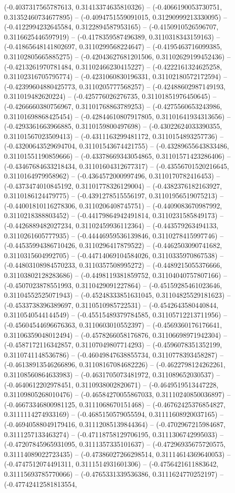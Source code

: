 (-0.4037317565787613, 0.31413374635810326) -- (-0.4066190053730751, 0.31352460734677895) -- (-0.4094751559091015, 0.31290999213330095) -- (-0.4122994232645584, 0.3122894587953165) -- (-0.4150910526596707, 0.3116625446597919) -- (-0.4178359587496389, 0.3110318343159163) -- (-0.41865648141802697, 0.3110299568224647) -- (-0.4195463716099385, 0.31102805665885275) -- (-0.42043627681201506, 0.31102629199452436) -- (-0.4213261970781484, 0.31102466230415227) -- (-0.4222161324625258, 0.31102316705795774) -- (-0.4231060830196331, 0.31102180572172594) -- (-0.42399604880425773, 0.3110205777568257) -- (-0.42488602987149193, 0.311019482620224) -- (-0.425776026276735, 0.31101851976450645) -- (-0.4266660380756967, 0.31101768863789253) -- (-0.4275560653243986, 0.31101698868425454) -- (-0.42844610807917805, 0.31101641934313656) -- (-0.4293361663966885, 0.3110159800497698) -- (-0.43022624033390355, 0.31101567023509413) -- (-0.4311163299481172, 0.3110154893257736) -- (-0.43200643529694704, 0.31101543674421755) -- (-0.43289655643833486, 0.31101551190859666) -- (-0.43378669343054865, 0.31101571423286406) -- (-0.43467684633218434, 0.31101604312677317) -- (-0.43556701520216645, 0.3110164979958962) -- (-0.4364572000997496, 0.3110170782416453) -- (-0.4373474010845192, 0.31101778326129004) -- (-0.4382376182163927, 0.3110186124479775) -- (-0.4391278515556197, 0.31101956519075213) -- (-0.44001810116278306, 0.3110206408745751) -- (-0.4409083670987992, 0.3110218388803452) -- (-0.44179864942491814, 0.3110231585849173) -- (-0.4426889482027234, 0.31102459936112364) -- (-0.443579263494133, 0.3110261605777935) -- (-0.44446959536139846, 0.3110278415997746) -- (-0.44535994386710426, 0.3110296417879522) -- (-0.4462503090741682, 0.3110315604992705) -- (-0.44714069104584026, 0.3110335970867538) -- (-0.44803108984570233, 0.3110357508995272) -- (-0.4489215055376666, 0.31103802128283686) -- (-0.4498119381859752, 0.31104040757807166) -- (-0.4507023878551993, 0.3110429091227864) -- (-0.45159285461023646, 0.31104552525071943) -- (-0.45248333851631045, 0.31104825529181623) -- (-0.4533738396389697, 0.3110510985722531) -- (-0.4542643580440844, 0.3110540544144549) -- (-0.45515489379784585, 0.31105712213711956) -- (-0.45604544696676363, 0.3110603010552397) -- (-0.4569360176176641, 0.31106359048012494) -- (-0.4578266058176876, 0.31106698971942304) -- (-0.4587172116342857, 0.31107049807714293) -- (-0.4596078351352199, 0.3110741148536786) -- (-0.46049847638855734, 0.3110778393458287) -- (-0.46138913546266896, 0.31108167084682226) -- (-0.4622798124262261, 0.31108560864633983) -- (-0.4631705073481972, 0.311089652030537) -- (-0.4640612202978451, 0.3110938002820671) -- (-0.4649519513447228, 0.31109805268010476) -- (-0.46584270055867033, 0.31110240850036897) -- (-0.46673346800981125, 0.3111068670151468) -- (-0.46762425376854827, 0.3111114274933169) -- (-0.4685150579055594, 0.31111608920037165) -- (-0.46940588049179416, 0.31112085139844364) -- (-0.4702967215984687, 0.3111257133463274) -- (-0.47118758129706195, 0.3111306742995033) -- (-0.47207845965931095, 0.3111357335101637) -- (-0.47296935675720575, 0.31114089022723435) -- (-0.47386027266298514, 0.31114614369640053) -- (-0.4747512074491311, 0.3111514931601306) -- (-0.4756421611883642, 0.31115693785770066) -- (-0.4765331339536386, 0.3111624770252197) -- (-0.47742412581813554, 